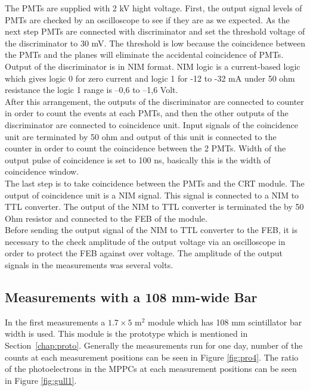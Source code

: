 \documentclass[a4paper]{article}\linespread{1.4}
\begin{document}
The PMTs are supplied with 2 kV hight voltage. 
First, the output signal levels of PMTs are checked by an oscilloscope to see if they are as we expected. %
As the next step PMTs are connected with discriminator and set the threshold voltage of the discriminator to 30 mV. The threshold is low because the coincidence between the PMTs and the planes will eliminate the accidental coincidence of PMTs. Output  of the discriminator is in NIM format. NIM logic is a current-based logic which gives logic 0 for zero current and logic 1 for -12 to -32 mA under 50 ohm resistance the logic 1 range is –0,6 to –1,6 Volt. %
\\After this arrangement, the outputs of the discriminator are connected to counter in order to count the events at each PMTs, and then the other outputs of the discriminator are connected to coincidence unit. Input signals of the coincidence unit are terminated by 50 ohm and output of this unit is connected to the counter in order to count the coincidence between the 2 PMTs. Width of the output pulse of coincidence is set to 100 ns, basically this is the width of coincidence window.   
\\The last step is to take coincidence between the PMTs and the CRT module. The output of coincidence unit is a NIM signal. This signal is connected to a NIM to TTL converter. The output of the NIM to TTL converter is terminated the by 50 Ohm resistor and connected to the FEB of the module. 
\\Before sending the output signal of the NIM to TTL converter to the FEB, it is necessary to the check amplitude of the output voltage via an oscilloscope in order to protect the FEB against over voltage. The amplitude of the output signals in the measurements was several volts.

\subsection{Measurements with a 108 mm-wide Bar} \label{chap:108mm}
In the first measurements a $1.7 \times 5$ $\mathrm{m^{2}}$ module which has 108 mm scintillator bar width is used. This module is the prototype which is mentioned in Section~\ref{chap:proto}. Generally the measurements run for one day, number of the counts at each measurement positions can be seen in Figure \ref{fig:pro4}. 
The ratio of the photoelectrons in the MPPCs at each measurement positions can be seen in Figure \ref{fig:gull1}.
\end{document}
